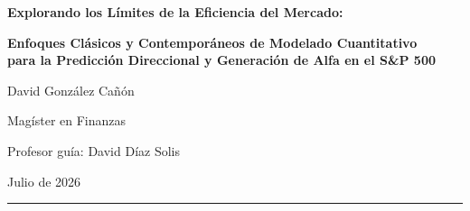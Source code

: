 ﻿\documentclass[11pt,a4paper]{article}
\begin{document}
\thispagestyle{empty}
\begin{center}

\vspace*{0.8cm}

{\LARGE\bfseries Explorando los L\'imites de la Eficiencia del Mercado:\par}
\vspace{0.5cm}
{\Large\bfseries Enfoques Cl\'asicos y Contempor\'aneos de Modelado Cuantitativo\\ para la Predicci\'on Direccional y Generaci\'on de Alfa en el S\&P 500\par}

\vspace{1.2cm}

{\large David Gonz\'alez Ca\~n\'on\par}
\vspace{0.4cm}
{\normalsize Mag\'ister en Finanzas\par}
\vspace{0.2cm}
{\normalsize Profesor gu\'ia: David D\'iaz Solis\par}
\vspace{0.2cm}
{\normalsize Julio de 2026\par}

\vspace{1.2cm}

\noindent\rule{0.9\textwidth}{0.5pt}

\vspace{0.8cm}

\end{center}
\end{document}
